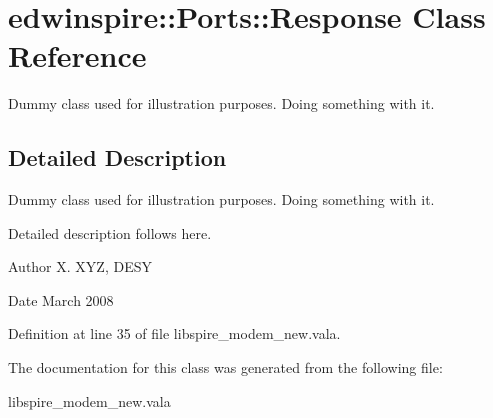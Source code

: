 \hypertarget{classedwinspire_1_1_ports_1_1_response}{\section{edwinspire\-:\-:Ports\-:\-:Response Class Reference}
\label{classedwinspire_1_1_ports_1_1_response}
}


Dummy class used for illustration purposes. Doing something with it.  




\subsection{Detailed Description}
Dummy class used for illustration purposes. Doing something with it. 

Detailed description follows here. \begin{DoxyAuthor}{Author}
X. X\-Y\-Z, D\-E\-S\-Y 
\end{DoxyAuthor}
\begin{DoxyDate}{Date}
March 2008 
\end{DoxyDate}


Definition at line 35 of file libspire\-\_\-modem\-\_\-new.\-vala.



The documentation for this class was generated from the following file\-:\begin{DoxyCompactItemize}
\item 
libspire\-\_\-modem\-\_\-new.\-vala\end{DoxyCompactItemize}

